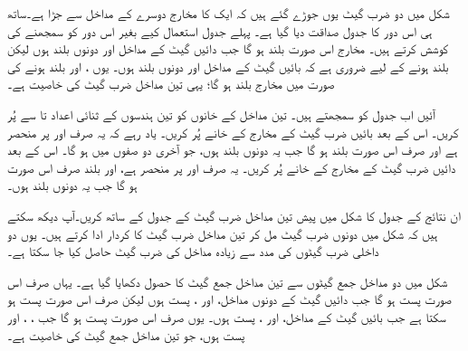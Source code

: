 شکل  میں دو ضرب گیٹ یوں جوڑے گئے ہیں کہ ایک کا مخارج دوسرے کے مداخل سے جڑا ہے۔ساتھ ہی اس دور کا  جدول  صداقت دیا گیا ہے۔ پہلے جدول استعمال کیے بغیر اس دور کو سمجھنے کی کوشش کرتے ہیں۔ مخارج  اس صورت بلند ہو گا جب دائیں گیٹ کے مداخل  اور  دونوں بلند ہوں لیکن  بلند ہونے کے لیے ضروری ہے کہ بائیں گیٹ کے مداخل  اور  دونوں بلند ہوں۔ یوں ،  اور  بلند ہونے کی صورت میں مخارج  بلند ہو گا؛ یہی تین مداخل ضرب گیٹ کی خاصیت ہے۔


آئیں اب جدول کو سمجھتے ہیں۔ تین مداخل  کے خانوں کو تین ہندسوں کے ثنائی اعداد  تا  سے پُر کریں۔ اس کے بعد بائیں ضرب گیٹ کے مخارج  کے خانے پُر کریں۔ یاد رہے کہ یہ صرف  اور  پر منحصر ہے اور صرف اس صورت بلند ہو گا جب یہ دونوں بلند ہوں، جو آخری دو صفوں میں ہو گا۔ اس کے بعد دائیں ضرب گیٹ کے مخارج  کے خانے پُر کریں۔ یہ صرف  اور  پر منحصر ہے، اور بلند صرف اس صورت ہو گا جب یہ دونوں بلند ہوں۔

ان نتائج کے جدول  کا شکل   میں پیش تین مداخل ضرب گیٹ کے جدول کے ساتھ کریں۔آپ دیکھ سکتے ہیں کہ شکل  میں دونوں ضرب گیٹ مل کر تین مداخل ضرب گیٹ کا کردار ادا کرتے ہیں۔ یوں دو داخلی ضرب گیٹوں کی مدد سے زیادہ مداخل کی ضرب گیٹ حاصل کیا جا سکتا ہے۔

 شکل  میں دو مداخل جمع گیٹوں سے تین مداخل جمع گیٹ کا حصول دکھایا گیا ہے۔ یہاں  صرف اس صورت پست ہو گا جب دائیں گیٹ کے دونوں مداخل،  اور ، پست ہوں لیکن  صرف اس صورت پست ہو سکتا ہے جب بائیں گیٹ کے مداخل،  اور ، پست ہوں۔ یوں  صرف اس صورت پست ہو گا جب ، ، اور  پست ہوں، جو تین مداخل جمع گیٹ کی خاصیت ہے۔

